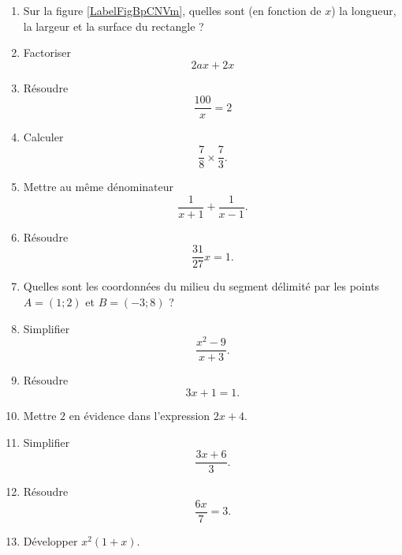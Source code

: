 \begin{exercice}
\begin{multicols}{2}
\begin{enumerate}
        \item
Sur la figure \ref{LabelFigBpCNVm}, quelles sont (en fonction de \( x\)) la longueur, la largeur et la surface du rectangle ?

        \item
            Factoriser
            \begin{equation}
                2ax+2x   
            \end{equation}
        \item
            Résoudre
            \begin{equation}
                \frac{ 100 }{ x }=2
            \end{equation}
        \item
            Calculer
            \begin{equation}
                \frac{ 7 }{ 8 }\times\frac{ 7 }{ 3 }.
            \end{equation}
        \item
            Mettre au même dénominateur
            \begin{equation}
                \frac{1}{ x+1 }+\frac{1}{ x-1 }.
            \end{equation}

        \item
            Résoudre
            \begin{equation}
                \frac{ 31 }{ 27 }x=1.
            \end{equation}
        \item
            Quelles sont les coordonnées du milieu du segment délimité par les points \( A=(1;2)\) et \( B=(-3;8)\) ?
        \item
            Simplifier
            \begin{equation}
                \frac{ x^2-9 }{ x+3 }.
            \end{equation}
        \item
            Résoudre
            \begin{equation}
                3x+1=1.
            \end{equation}

        \item
            Mettre \( 2\) en évidence dans l'expression \( 2x+4\).
        \item
            Simplifier
            \begin{equation}
                \frac{ 3x+6 }{ 3 }.
            \end{equation}
        \item
            Résoudre
            \begin{equation}
                \frac{ 6x }{ 7 }=3.
            \end{equation}
        \item
            Développer \( x^2(1+x)\).


\end{enumerate}
\end{multicols}
\end{exercice}
